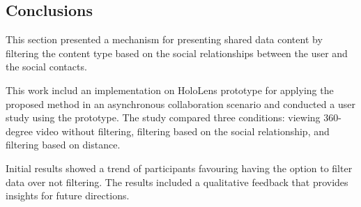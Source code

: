 

\subsection{Conclusions}

This section presented a mechanism for presenting shared data content by filtering the content type based on the social relationships between the user and the social contacts. 

This work includ an implementation on HoloLens prototype for applying the proposed method in an asynchronous collaboration scenario and conducted a user study using the prototype. The study compared three conditions: viewing 360-degree video without filtering, filtering based on the social relationship, and filtering based on distance.

Initial results showed a trend of participants favouring having the option to filter data over not filtering. The results included a qualitative feedback that provides insights for future directions. 
